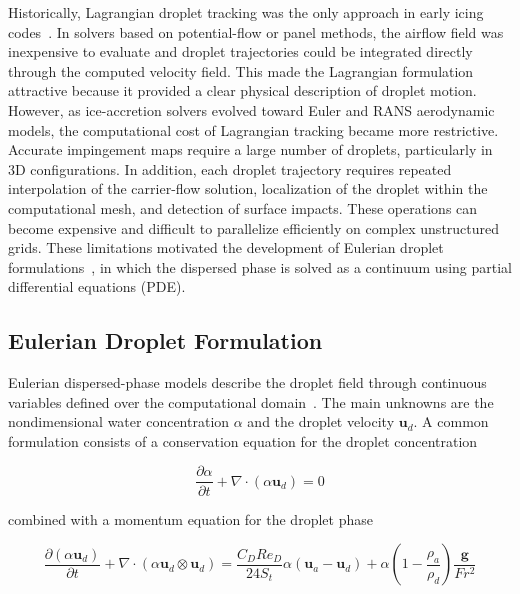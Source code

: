 Historically, Lagrangian droplet tracking was the only approach in early icing codes~\cite{wright2008user,saeed2001modified}. In solvers based on potential-flow or panel methods, the airflow field was inexpensive to evaluate and droplet trajectories could be integrated directly through the computed velocity field. This made the Lagrangian formulation attractive because it provided a clear physical description of droplet motion. However, as ice-accretion solvers evolved toward Euler and RANS aerodynamic models, the computational cost of Lagrangian tracking became more restrictive. Accurate impingement maps require a large number of droplets, particularly in 3D configurations. In addition, each droplet trajectory requires repeated interpolation of the carrier-flow solution, localization of the droplet within the computational mesh, and detection of surface impacts. These operations can become expensive and difficult to parallelize efficiently on complex unstructured grids. These limitations motivated the development of Eulerian droplet formulations~\cite{bourgault1999finite}, in which the dispersed phase is solved as a continuum using partial differential equations (PDE).

\subsection{Eulerian Droplet Formulation}\label{sec:eulerianTracking}

Eulerian dispersed-phase models describe the droplet field through continuous variables defined over the computational domain~\cite{bourgault1999finite}. The main unknowns are the nondimensional water concentration $\alpha$ and the droplet velocity $\boldsymbol{u}_d$. A common formulation consists of a conservation equation for the droplet concentration

\begin{equation}
\frac{\partial \alpha}{\partial t}
+ \nabla \cdot \left(\alpha \boldsymbol{u}_d\right) = 0
\label{eq:continuityDroplet}
\end{equation}

combined with a momentum equation for the droplet phase

\begin{equation}
\frac{\partial \left(\alpha \boldsymbol{u}_d\right)}{\partial t}
+ \nabla \cdot
\left(\alpha \boldsymbol{u}_d \otimes \boldsymbol{u}_d\right)
=
\frac{C_D Re_D}{24S_t}\alpha
\left(\boldsymbol{u}_a-\boldsymbol{u}_d\right)
+
\alpha
\left(1-\frac{\rho_a}{\rho_d}\right)
\frac{\boldsymbol{g}}{Fr^2}
\label{eq:momentumDroplet}
\end{equation}

